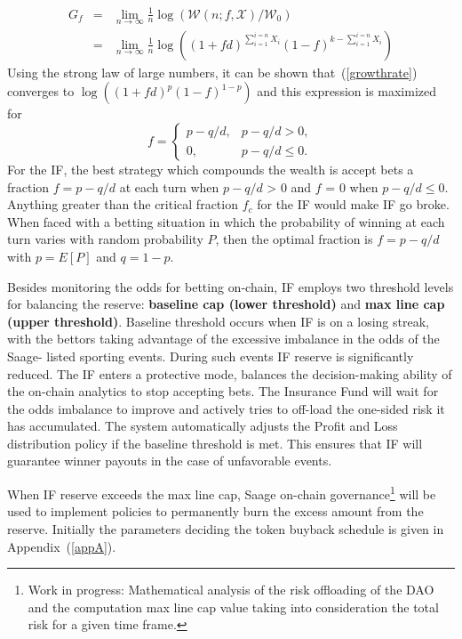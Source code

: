 \documentclass[%
 reprint,
 amsmath,amssymb,
 aps,
]{revtex4-2}
\begin{document}
\begin{eqnarray}
G_f &=& \lim_{n\rightarrow \infty} \frac{1}{n} \log(\mathcal{W}(n; f, \mathcal{X})/\mathcal{W}_0) \nonumber\\
& = & \lim_{n\rightarrow \infty}\frac{1}{n} \log( (1 + f d)^{\sum_{i=1}^{i=n} X_i} (1 - f)^{k - \sum_{i=1}^{i=n} X_i})
\label{growthrate}
\end{eqnarray}
Using the strong law of large numbers, it can be shown that~(\ref{growthrate}) converges to $\log((1 + f d)^p (1 - f)^{1 - p} )$ and this expression is maximized for 
\begin{equation}
f = \left\{
\begin{array}{ll}
p - q/d , & p - q/d > 0, \\[2pt]
0, & p - q/d \leq 0.
\end{array} \right.
\label{optbetfraction}
\end{equation}
For the IF, the best strategy which compounds the wealth is accept bets a fraction $f = p - q/d$ at each turn when $p - q/d$ > 0 and $f$ = 0 when $p - q/d \leq 0$. Anything greater than the critical fraction $f_c$ for the IF would make IF go broke. When faced with a betting situation in which the probability of winning at each turn varies with random probability $P$, then the optimal fraction is $f = p - q/d$ with $p = E[ P ]$ and $q = 1 - p$. 

Besides monitoring the odds for betting on-chain, IF employs two threshold levels for balancing the reserve: \textbf{baseline cap (lower threshold)} and \textbf{max line cap (upper threshold)}. Baseline threshold occurs when IF is on a losing streak, with the bettors taking advantage of the excessive imbalance in the odds of the Saage- listed sporting events. During such events IF reserve is significantly reduced. The IF enters a protective mode, balances the decision-making ability of the on-chain analytics to stop accepting bets. The Insurance Fund will wait for the odds imbalance to improve and actively tries to off-load the one-sided risk it has accumulated. The system automatically adjusts the Profit and Loss distribution policy if the baseline threshold is met. This ensures that IF  will guarantee winner payouts in the case of unfavorable events. 

When IF reserve exceeds the max line cap, Saage on-chain governance\footnote{Work in progress: Mathematical analysis of the risk offloading of the DAO and the computation max line cap value taking into consideration the total risk for a given time frame.} will be used to implement policies to permanently burn the excess amount from the reserve. Initially the parameters deciding the token buyback schedule is given in Appendix~(\ref{appA}). 
\end{document}
